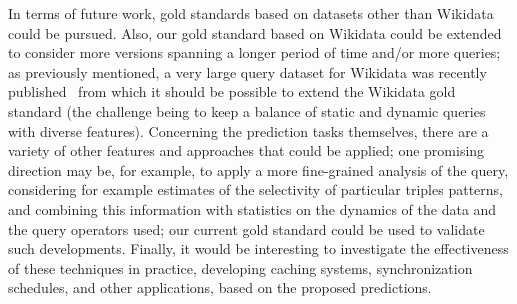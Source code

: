 \documentclass[runningheads]{llncs}
\begin{document}
In terms of future work, gold standards based on datasets other than Wikidata could be pursued. Also, our gold standard based on Wikidata could be extended to consider more versions spanning a longer period of time and/or more queries; as previously mentioned, a very large query dataset for Wikidata was recently published~\cite{MalyshevKGGB18} from which it should be possible to extend the Wikidata gold standard (the challenge being to keep a balance of static and dynamic queries with diverse features). Concerning the prediction tasks themselves, there are a variety of other features and approaches that could be applied; one promising direction may be, for example, to apply a more fine-grained analysis of the query, considering for example estimates of the selectivity of particular triples patterns, and combining this information with statistics on the dynamics of the data and the query operators used; our current gold standard could be used to validate such developments. Finally, it would be interesting to investigate the effectiveness of these techniques in practice, developing caching systems, synchronization schedules, and other applications, based on the proposed predictions.



\end{document}
